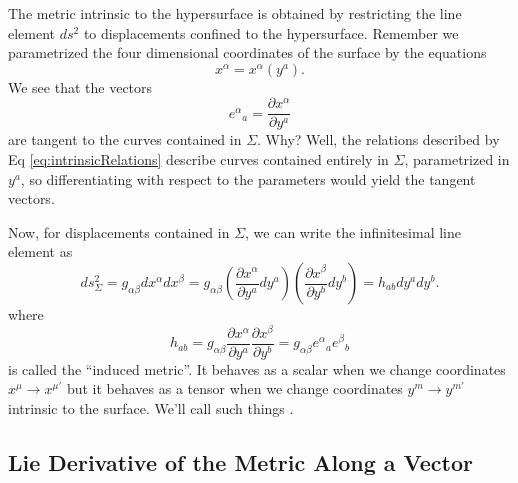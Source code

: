 The metric intrinsic to
the hypersurface is obtained by restricting the line element $ds^2$ to
displacements confined to the hypersurface. Remember we
parametrized the four dimensional coordinates of the surface by
the equations
\begin{equation}\label{eq:intrinsicRelations}
x^{\alpha}=x^{\alpha}(y^a).
\end{equation}
We see that the vectors
\begin{equation}%
{e^{\alpha}}_{a} = \frac{\partial x^{\alpha}}{\partial y^a}
\end{equation}
are tangent to the curves contained in $\Sigma$. Why? Well, the
relations described by Eq \eqref{eq:intrinsicRelations} describe
curves contained entirely in $\Sigma$, parametrized in $y^a$, so
differentiating with respect to the parameters would yield the
tangent vectors.

Now, for displacements contained in $\Sigma$, we can write the
infinitesimal line element as
\begin{equation}%
ds_{\Sigma}^{2} = g_{\alpha\beta}dx^{\alpha}dx^{\beta} =
g_{\alpha\beta}\left(\frac{\partial x^{\alpha}}{\partial y^{a}}dy^{a}\right)\left(\frac{\partial x^{\beta}}{\partial y^{b}}dy^{b}\right)
= h_{ab}dy^ady^b.
\end{equation}
where
\begin{equation}%
h_{ab} = g_{\alpha\beta}\frac{\partial x^{\alpha}}{\partial
  y^{a}}\frac{\partial x^{\beta}}{\partial y^{b}} = g_{\alpha\beta}{e^{\alpha}}_{a}{e^{\beta}}_{b}
\end{equation}
is called the ``induced metric''. It behaves as a scalar when we
change coordinates $x^{\mu}\to x^{\mu'}$ but it behaves as a
tensor when we change coordinates $y^{m}\to y^{m'}$ intrinsic to
the surface. We'll call such things . 

\subsection{Lie Derivative of the Metric Along a Vector}\label{sstn:lieDerivativeOfMetricAlongVector}


